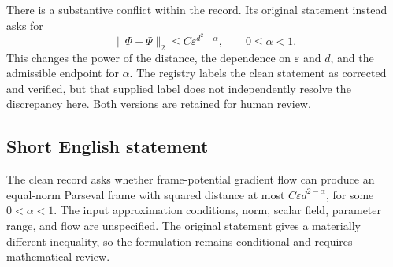 \documentclass[11pt]{article}
\begin{document}
There is a substantive conflict within the record. Its original statement instead asks for
\[
\|\Phi-\Psi\|_2\le C\varepsilon^{d^2-\alpha},\qquad 0\le\alpha<1.
\]
This changes the power of the distance, the dependence on \(\varepsilon\) and \(d\), and the admissible endpoint for \(\alpha\). The registry labels the clean statement as corrected and verified, but that supplied label does not independently resolve the discrepancy here. Both versions are retained for human review.
\subsection{Short English statement}
The clean record asks whether frame-potential gradient flow can produce an equal-norm Parseval frame with squared distance at most \(C\varepsilon d^{2-\alpha}\), for some \(0<\alpha<1\). The input approximation conditions, norm, scalar field, parameter range, and flow are unspecified. The original statement gives a materially different inequality, so the formulation remains conditional and requires mathematical review.
\end{document}
